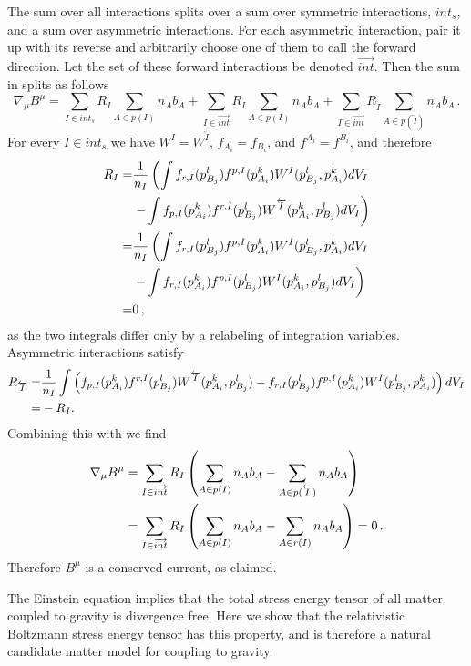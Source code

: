 The sum over all interactions splits over a sum over symmetric interactions, $int_{s}$, and a sum over asymmetric interactions.  For each asymmetric interaction, pair it up with its reverse and arbitrarily choose one of them to call the forward direction.  Let the set of these forward interactions be denoted $\overrightarrow{int}$.  Then the sum in  splits as follows
\begin{equation}
\nabla_\mu B^\mu=\sum_{I\in int_s}R_I\sum_{A\in p(I)} n_A b_A+\sum_{I\in\overrightarrow{int}}R_I\sum_{A\in p(I)} n_Ab_A+\sum_{I\in\overrightarrow{int}}R_{\overleftarrow{I}}\sum_{A\in p(\overleftarrow{I})} n_Ab_A\,.
\end{equation}
For every $I\in int_s$ we have $W^I=W^{\overleftarrow{I}}$, $f_{A_i}=f_{B_i}$, and $f^{A_i}=f^{B_i}$, and therefore
\begin{align}
R_I=&\frac{1}{n_I}\left(\int f_{r,I}(p_{B_j}^l)f^{p,I}(p_{A_i}^k)W^I(p_{B_j}^l,p_{A_i}^k)  dV_I \right.\\
&\left. -\int f_{p,I}(p_{A_i}^k)f^{r,I}(p_{B_j}^l)W^{\overleftarrow{I}}(p_{A_i}^k,p_{B_j}^l)  dV_I\right)\notag\\
=&\frac{1}{n_I}\left(\int f_{r,I}(p_{B_j}^l)f^{p,I}(p_{A_i}^k)W^I(p_{B_j}^l,p_{A_i}^k)  dV_I \right.\notag\\
&\left. -\int f_{r,I}(p_{A_i}^k)f^{p,I}(p_{B_j}^l)W^{I}(p_{A_i}^k,p_{B_j}^l)  dV_I\right)\notag\\
=&0\,,\notag
\end{align}
as the two integrals differ only by a relabeling of integration variables.  Asymmetric interactions satisfy
\begin{align}
R_{\overleftarrow{I}}=&\frac{1}{n_I}\int\left(f_{p,I}(p_{A_i}^k)f^{r,I}(p_{B_j}^l)W^{\overleftarrow{I}}(p_{A_i}^k,p_{B_j}^l) 
-f_{r,I}(p_{B_j}^l)f^{p,I}(p_{A_i}^k)W^I(p_{B_j}^l,p_{A_i}^k)\right)  dV_I\notag\\
=&-R_I.
\end{align}
Combining this with  we find
\begin{align}
\nabla_\mu B^\mu&=\sum_{I\in\overrightarrow{int}}R_I\left(\sum_{A\in p(I)} n_Ab_A-\sum_{A\in p(\overleftarrow{I})} n_Ab_A\right)\\
&=\sum_{I\in\overrightarrow{int}}R_I\left(\sum_{A\in p(I)} n_Ab_A-\sum_{A\in r(I)} n_Ab_A\right)=0\,.\notag
\end{align}
Therefore  $B^\mu$ is a conserved current, as claimed.

The Einstein equation implies that the total stress energy tensor of all matter coupled to gravity is divergence free.  Here we show that the relativistic Boltzmann stress energy tensor  has this property, and is therefore a natural candidate matter model for  coupling to gravity.  


